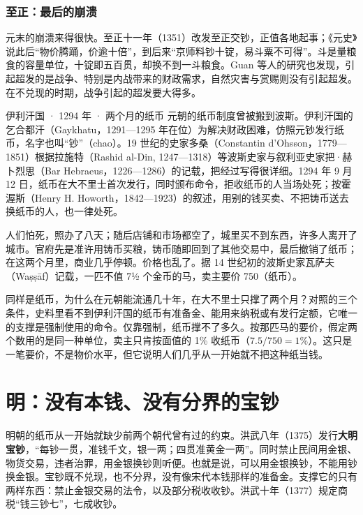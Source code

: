 \subsubsection{至正：最后的崩溃}
元末的崩溃来得很快。至正十一年（1351）改发至正交钞，正值各地起事；《元史》说此后“物价腾踊，价逾十倍”，到后来“京师料钞十锭，易斗粟不可得”\cite{yuanshi}。斗是量粮食的容量单位，十锭即五百贯，却换不到一斗粮食。Guan 等人的研究也发现，引起超发的是战争、特别是内战带来的财政需求，自然灾害与赏赐则没有引起超发。在不兑现的时期，战争引起的超发要大得多\cite{guan2024}。

\begin{case}{伊利汗国 · 1294 年 · 两个月的纸币}
元朝的纸币制度曾被搬到波斯。伊利汗国的乞合都汗（Gaykhatu，1291—1295 年在位）为解决财政困难，仿照元钞发行纸币，名字也叫“钞”（chao）。19 世纪的史家多桑（Constantin d'Ohsson，1779—1851）根据拉施特（Rashid al-Din, 1247—1318）等波斯史家与叙利亚史家把·赫卜烈思（Bar Hebraeus，1226—1286）的记载，把经过写得很详细。1294 年 9 月 12 日，纸币在大不里士首次发行，同时颁布命令，拒收纸币的人当场处死\cite{ohsson1835}；按霍渥斯（Henry H. Howorth，1842—1923）的叙述，用别的钱买卖、不把铸币送去换纸币的人，也一律处死\cite{howorth1888}。

人们怕死，照办了八天；随后店铺和市场都空了，城里买不到东西，许多人离开了城市。官府先是准许用铸币买粮，铸币随即回到了其他交易中，最后撤销了纸币；在这两个月里，商业几乎停顿\cite{ohsson1835,howorth1888}。价格也乱了。据 14 世纪初的波斯史家瓦萨夫（Waṣṣāf）记载，一匹不值 7½ 个金币的马，卖主要价 750（纸币）\cite{howorth1888}。

同样是纸币，为什么在元朝能流通几十年，在大不里士只撑了两个月？对照的三个条件，史料里看不到伊利汗国的纸币有准备金、能用来纳税或有发行定额，它唯一的支撑是强制使用的命令。仅靠强制，纸币撑不了多久。按那匹马的要价，假定两个数用的是同一种单位，卖主只肯按面值的 1\% 收纸币（$7.5/750=1\%$）。这只是一笔要价，不是物价水平，但它说明人们几乎从一开始就不把这种纸当钱。
\end{case}

\section{明：没有本钱、没有分界的宝钞}\label{sec:songming-ming}

明朝的纸币从一开始就缺少前两个朝代曾有过的约束。洪武八年（1375）发行\textbf{大明宝钞}，“每钞一贯，准钱千文，银一两；四贯准黄金一两”。同时禁止民间用金银、物货交易，违者治罪，用金银换钞则听便\cite{mingshi}。也就是说，可以用金银换钞，不能用钞换金银。宝钞既不兑现，也不分界，没有像宋代本钱那样的准备金\cite{vonglahn1996,pengxinwei}。支撑它的只有两样东西：禁止金银交易的法令，以及部分税收收钞。洪武十年（1377）规定商税“钱三钞七”，七成收钞\cite{mingshi}。

